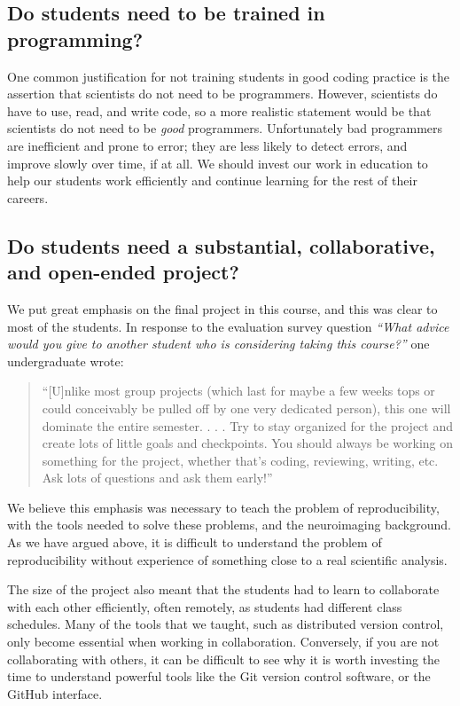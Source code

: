 \subsection{Do students need to be trained in programming?}

One common justification for not training students in good coding practice is
the assertion that scientists do not need to be programmers.  However, scientists do
have to use, read, and write code, so a more realistic 
statement would be that scientists do not need to be \emph{good} programmers.
Unfortunately bad programmers are inefficient and prone to error; they are
less likely to detect errors, and improve slowly over time, if at all.  We
should invest our work in education to help our students work efficiently and
continue learning for the rest of their careers.

\subsection{Do students need a substantial, collaborative, and open-ended project?}

We put great emphasis on the final project in this course, and this was clear
to most of the students.  In response to the evaluation survey question
\emph{``What advice would you give to another student who is considering taking this course?''}
one undergraduate wrote:
\begin{quotation}
``[U]nlike most group projects (which last for maybe a few weeks tops or
could conceivably be pulled off by one very dedicated person), this one will
dominate the entire semester. . . . Try to stay organized for the project and
create lots of little goals and checkpoints. You should always be working on
something for the project, whether that's coding, reviewing, writing, etc. Ask
lots of questions and ask them early!''
\end{quotation}

We believe this emphasis was necessary to teach the problem of
reproducibility, with the tools needed to solve these problems, and the
neuroimaging background.  As we have argued above, it is difficult to
understand the problem of reproducibility without experience of something
close to a real scientific analysis.

The size of the project also meant that the students had to learn to
collaborate with each other efficiently, often remotely, as students had
different class schedules.  Many of the tools that we taught, such as
distributed version control, only become essential when working in
collaboration.  Conversely, if you are not collaborating with others, it can
be difficult to see why it is worth investing the time to understand powerful
tools like the Git version control software, or the GitHub interface.


